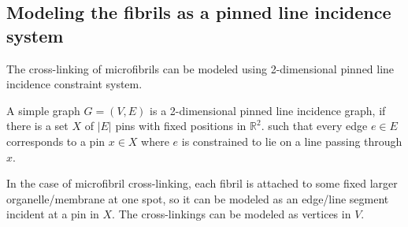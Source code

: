 \subsection{Modeling the fibrils as a pinned line incidence system}



The cross-linking of microfibrils can be modeled using 2-dimensional pinned line incidence constraint system. 

\begin{definition}  \label{prob:pinned_subspace}
A simple graph $G=(V,E)$ is a 2-dimensional pinned line incidence graph, 
if there is  a  set $X$ of $|E|$ pins with fixed positions in $\mathbb{R}^2$.
such that 
 every edge $e \in E$ corresponds to a pin $x \in X$ where $e$ is constrained to lie on a line passing through $x$.

\end{definition}



In the case of microfibril cross-linking, each fibril is 
attached to some fixed larger organelle/membrane at one spot, 
so it can be modeled as an edge/line segment incident at a pin in $X$. 
The cross-linkings can be modeled as vertices in $V$.


